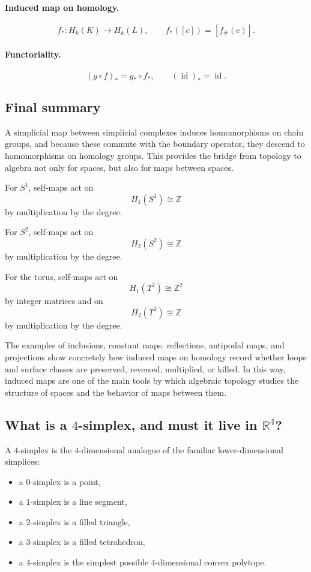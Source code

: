 \documentclass[12pt,a4paper]{article}
\theoremstyle{notespace}
\begin{document}
\paragraph{Induced map on homology.}
\[
f_*:H_k(K)\to H_k(L),
\qquad
f_*([c])=[f_\#(c)].
\]

\paragraph{Functoriality.}
\[
(g\circ f)_*=g_*\circ f_*,
\qquad
(\operatorname{id})_*=\operatorname{id}.
\]

\subsection{Final summary}

A simplicial map between simplicial complexes induces homomorphisms on chain groups, and because these commute with the boundary operator, they descend to homomorphisms on homology groups. This provides the bridge from topology to algebra not only for spaces, but also for maps between spaces.

For \(S^1\), self-maps act on
\[
H_1(S^1)\cong \mathbb{Z}
\]
by multiplication by the degree.

For \(S^2\), self-maps act on
\[
H_2(S^2)\cong \mathbb{Z}
\]
by multiplication by the degree.

For the torus, self-maps act on
\[
H_1(T^2)\cong \mathbb{Z}^2
\]
by integer matrices and on
\[
H_2(T^2)\cong \mathbb{Z}
\]
by multiplication by the degree.

The examples of inclusions, constant maps, reflections, antipodal maps, and projections show concretely how induced maps on homology record whether loops and surface classes are preserved, reversed, multiplied, or killed. In this way, induced maps are one of the main tools by which algebraic topology studies the structure of spaces and the behavior of maps between them.

\subsection{What is a \texorpdfstring{$4$}{4}-simplex, and must it live in \texorpdfstring{$\mathbb{R}^4$}{R4}?}

A \(4\)-simplex is the \(4\)-dimensional analogue of the familiar lower-dimensional simplices:
\begin{itemize}
	\item a \(0\)-simplex is a point,
	\item a \(1\)-simplex is a line segment,
	\item a \(2\)-simplex is a filled triangle,
	\item a \(3\)-simplex is a filled tetrahedron,
	\item a \(4\)-simplex is the simplest possible \(4\)-dimensional convex polytope.
\end{itemize}
\end{document}
